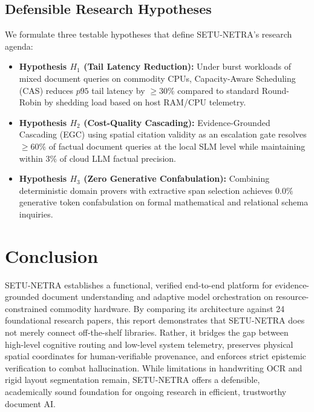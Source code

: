 \documentclass[11pt,a4paper]{article}
\begin{document}
\subsection{Defensible Research Hypotheses}
We formulate three testable hypotheses that define SETU-NETRA's research agenda:
\begin{itemize}[leftmargin=*]
    \item \textbf{Hypothesis $H_1$ (Tail Latency Reduction):} Under burst workloads of mixed document queries on commodity CPUs, Capacity-Aware Scheduling (CAS) reduces $p95$ tail latency by $\ge 30\%$ compared to standard Round-Robin by shedding load based on host RAM/CPU telemetry.
    \item \textbf{Hypothesis $H_2$ (Cost-Quality Cascading):} Evidence-Grounded Cascading (EGC) using spatial citation validity as an escalation gate resolves $\ge 60\%$ of factual document queries at the local SLM level while maintaining within $3\%$ of cloud LLM factual precision.
    \item \textbf{Hypothesis $H_3$ (Zero Generative Confabulation):} Combining deterministic domain provers with extractive span selection achieves $0.0\%$ generative token confabulation on formal mathematical and relational schema inquiries.
\end{itemize}

\section{Conclusion}
\label{sec:conclusion}

SETU-NETRA establishes a functional, verified end-to-end platform for evidence-grounded document understanding and adaptive model orchestration on resource-constrained commodity hardware. By comparing its architecture against 24 foundational research papers, this report demonstrates that SETU-NETRA does not merely connect off-the-shelf libraries. Rather, it bridges the gap between high-level cognitive routing and low-level system telemetry, preserves physical spatial coordinates for human-verifiable provenance, and enforces strict epistemic verification to combat hallucination. While limitations in handwriting OCR and rigid layout segmentation remain, SETU-NETRA offers a defensible, academically sound foundation for ongoing research in efficient, trustworthy document AI.

\newpage


\end{document}
